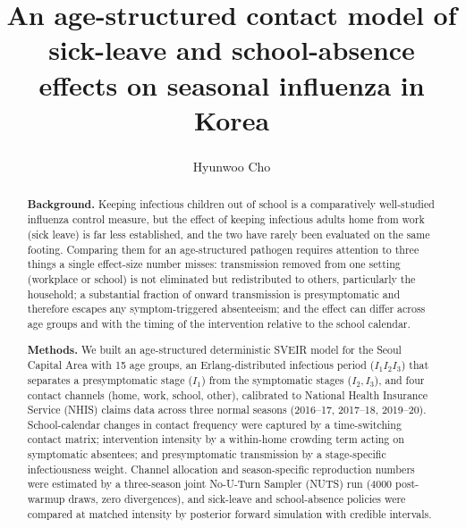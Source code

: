 \documentclass[12pt]{article}
\title{\fontsize{22pt}{26pt}\selectfont
An age-structured contact model of sick-leave and school-absence effects on seasonal influenza in Korea}
\author{Hyunwoo Cho\textsuperscript{}}
\affil[]{}
\date{}
\theoremstyle{plain}
\theoremstyle{remark}
\theoremstyle{definition}
\begin{document}
\maketitle

\begin{abstract}
\noindent\textbf{Background.} Keeping infectious children out of school is a comparatively well-studied influenza control measure, but the effect of keeping infectious adults home from work (sick leave) is far less established, and the two have rarely been evaluated on the same footing. Comparing them for an age-structured pathogen requires attention to three things a single effect-size number misses: transmission removed from one setting (workplace or school) is not eliminated but redistributed to others, particularly the household; a substantial fraction of onward transmission is presymptomatic and therefore escapes any symptom-triggered absenteeism; and the effect can differ across age groups and with the timing of the intervention relative to the school calendar.

\noindent\textbf{Methods.} We built an age-structured deterministic SVEIR model for the Seoul Capital Area with 15 age groups, an Erlang-distributed infectious period ($I_1 I_2 I_3$) that separates a presymptomatic stage ($I_1$) from the symptomatic stages ($I_2, I_3$), and four contact channels (home, work, school, other), calibrated to National Health Insurance Service (NHIS) claims data across three normal seasons (2016--17, 2017--18, 2019--20). School-calendar changes in contact frequency were captured by a time-switching contact matrix; intervention intensity by a within-home crowding term acting on symptomatic absentees; and presymptomatic transmission by a stage-specific infectiousness weight. Channel allocation and season-specific reproduction numbers were estimated by a three-season joint No-U-Turn Sampler (NUTS) run (4000 post-warmup draws, zero divergences), and sick-leave and school-absence policies were compared at matched intensity by posterior forward simulation with credible intervals.


\end{abstract}
\end{document}

